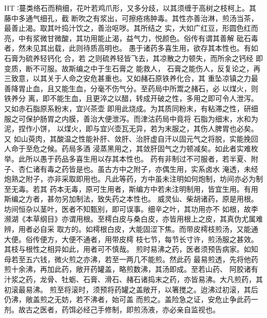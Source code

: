 \documentclass[a4paper,12pt,UTF8,twoside]{ctexbook}
\begin{document}
HT ∶蔓类络石而稍细，花叶若鸡爪形，又多分歧，以其须缠于高树之枝柯上。其藤中多通气细孔，截 
断吹之有浆出，可擦疮疡肿毒。其性亦善治淋，煎汤当茶，最善止渴。取其叶捣汁饮之，善治呕哕。其所结之 
实，大如广红豆，形圆色红而亮，中有浆微甘微酸，其功用能止渴，益气力，悦颜色。俗传有谓其善解 
砒石毒者，然未见其出载，此则待质高明也。 
愚于诸药多喜生用，欲存其本性也。有如石膏为硫养轻钙化 
合，若 之则硫养轻皆飞去，其凉散之力顿失，而所余之钙经 即变质，断不可服。故斯编之中于生石膏之 
能救人， 石膏之能伤人，反复论之，再三致意，以其关于人命之安危甚重也。又如赭石原铁养化合，其 
重坠凉镇之力最善降胃止血，且又能生血，分毫不伤气分。至药局中所鬻之赭石，必 以煤火，则铁养分 
离，即不能生血，且更淬之以醋，转成开破之性，多用之即可令人泄泻。又如赤石脂原系粉末，宜兴茶壶 
即用此烧成。为其质同粉末，有粘滞之性，研细服之可保护肠胃之内膜，善治大便泄泻。而津沽药局中竟将 
石脂为细末，水和为泥，捏作小饼， 以煤火，即与宜兴壶瓦无异，若为末服之，其伤人脾胃也必矣。又 
如山萸肉，其酸温之性能补肝、敛肝、治肝虚自汗以固元气之将脱，实能挽回人命于至危之候。药局多酒 
浸蒸黑用之，其敛肝固气之力顿减矣。如此者实难枚举。此所以愚于药品多喜生用以存其本性也。 
药有非制过不可服者，若半夏、附子、杏仁诸有毒之药皆是也。虽古方中之附子，亦偶生用，实系卤水 
淹透，未经炮熟之附子，亦非采取即用也。凡此等药，方中虽未注明如何炮制，坊间亦必为制至无毒。若其 
药本无毒，原可生用者，斯编方中若未注明制用，皆宜生用。有用斯编之方者，甚勿另加制法，致失药之本性也。 
威灵仙、柴胡诸药，原是用根。坊间恒杂以茎叶，医者不知甄别，即可误事。细辛之叶，其功用亦不 
如根，故李濒湖《本草纲目》亦谓用根。至樗白皮与桑白皮，亦皆用根上之皮，其真伪尤属难辨，用者必自采 
取方的。如樗根白皮，大能固涩下焦。而带皮樗枝煎汤，又能通大便。俗传便方，大便不通者，用带皮樗 
枝七节，每节长寸许，煎汤服之甚效。其枝与根性之相异如此，用者可不慎哉。 
煎时易沸之药，医者须预告病家。如知母若至五六钱，微火煎之亦沸，若至一两几不能煎。然此药 
最易煎透，先将他药煎十余沸，再加此药，敞开药罐盖，略煎数沸，其汤即成。至若山药、 
阿胶诸有汁浆之药，龙骨、牡蛎、石膏、滑石、赭石诸捣末之药，亦皆易沸。大凡煎药，其初滚最易沸。 
煎至将滚时，须预将药罐之盖敞开，以箸搅之。迨沸过初滚，其后仍沸，敞盖煎之无妨，若不沸者，始可盖 
而煎之。盖险急之证，安危止争此药一剂。故古之医者，药饵必经己手修制，即煎汤液，亦必亲自监视也。 
\end{document}
